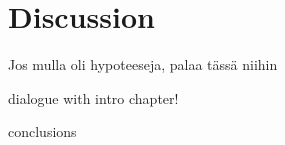 \section{Discussion}
\justify
Jos mulla oli hypoteeseja, palaa tässä niihin \par
dialogue with intro chapter! \par
conclusions\par